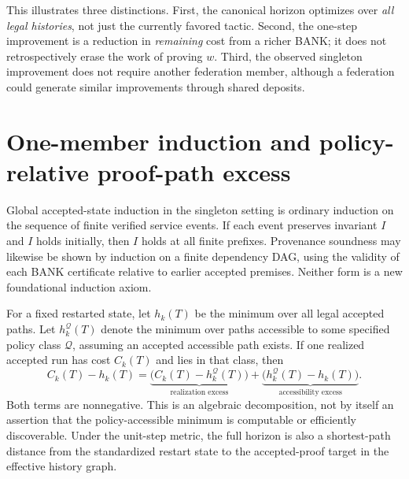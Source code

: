 \documentclass[11pt]{article}
\theoremstyle{definition}
\begin{document}
This illustrates three distinctions. First, the canonical horizon optimizes over \emph{all legal histories}, not just the currently favored tactic. Second, the one-step improvement is a reduction in \emph{remaining} cost from a richer BANK; it does not retrospectively erase the work of proving $w$. Third, the observed singleton improvement does not require another federation member, although a federation could generate similar improvements through shared deposits.

\section{One-member induction and policy-relative proof-path excess}
Global accepted-state induction in the singleton setting is ordinary induction on the sequence of finite verified service events. If each event preserves invariant $I$ and $I$ holds initially, then $I$ holds at all finite prefixes. Provenance soundness may likewise be shown by induction on a finite dependency DAG, using the validity of each BANK certificate relative to earlier accepted premises. Neither form is a new foundational induction axiom.

For a fixed restarted state, let $h_k(T)$ be the minimum over all legal accepted paths. Let $h_k^{\mathcal Q}(T)$ denote the minimum over paths accessible to some specified policy class $\mathcal Q$, assuming an accepted accessible path exists. If one realized accepted run has cost $C_k(T)$ and lies in that class, then
\[
C_k(T)-h_k(T)=
\underbrace{\bigl(C_k(T)-h_k^{\mathcal Q}(T)\bigr)}_{\text{realization excess}}
+\underbrace{\bigl(h_k^{\mathcal Q}(T)-h_k(T)\bigr)}_{\text{accessibility excess}}.
\]
Both terms are nonnegative. This is an algebraic decomposition, not by itself an assertion that the policy-accessible minimum is computable or efficiently discoverable. Under the unit-step metric, the full horizon is also a shortest-path distance from the standardized restart state to the accepted-proof target in the effective history graph.
\end{document}
